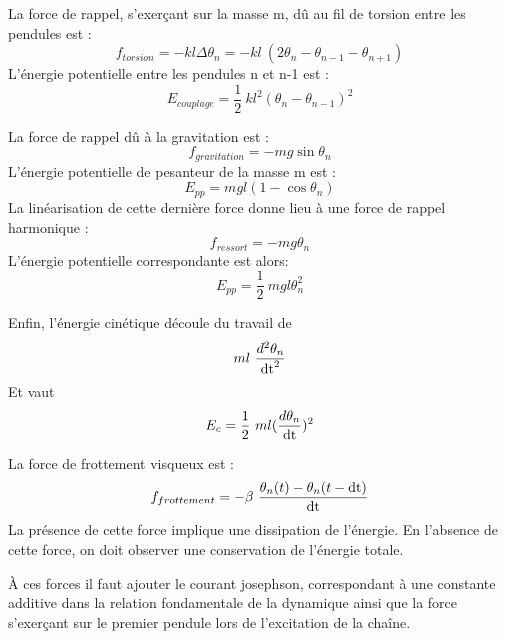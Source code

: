La force de rappel, s'exerçant sur la masse m, dû au fil de torsion entre les pendules est :
\[
f_{torsion} = -  k l \Delta \theta _n = -  k l\ (2\theta _n-\theta _{n-1}-\theta _{n+1})
\]
L'énergie potentielle entre les pendules n et n-1 est :
\[
E_{couplage} = \frac{1}{2}\ k l^2 (\theta _n-\theta _{n-1})^2
\]

La force de rappel dû à la gravitation est :
\[
f_{gravitation} = - m g \sin{\theta _n}
\]
L'énergie potentielle de pesanteur de la masse m est :
\[
E_{pp} = m g l (1 - \cos{\theta _n})
\]
La linéarisation de cette dernière force donne lieu à une force de rappel harmonique :
\[
f_{ressort} = - m g \theta _n
\]
L'énergie potentielle correspondante est alors:
\[
E_{pp} = \frac{1}{2}\ m g l \theta _n^2
\]

Enfin, l'énergie cinétique découle du travail de 
\[
m l\ \frac{d^2 \theta _n}{\operatorname{dt}^2}
\]
%
Et vaut
\[
E_{c} = \frac{1}{2}\ m l (\frac{d \theta _n}{\operatorname{dt}})^2
\]


La force de frottement visqueux est :
%
\[
f_{frottement} = -  \beta\ \frac{\theta _n(t) - \theta _n(t-\operatorname{dt})}{\operatorname{dt}}
\]
%
La présence de cette force implique une dissipation de l'énergie. En l'absence de cette force, on doit observer une conservation de l'énergie totale.

À ces forces il faut ajouter le courant josephson, correspondant à une constante additive dans la relation fondamentale de la dynamique ainsi que la force s'exerçant sur le premier pendule lors de l'excitation de la chaîne.
